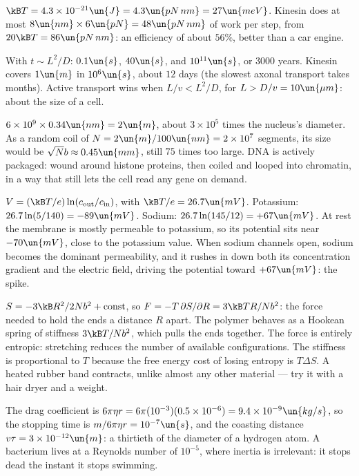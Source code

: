 
 $\kB T = 4.3\times10^{-21}\un{J} = 4.3\un{pN\,nm} = 27\un{meV}$. Kinesin does at most $8\un{nm}\times6\un{pN} = 48\un{pN\,nm}$ of work per step, from $20\kB T = 86\un{pN\,nm}$: an efficiency of about $56\%$, better than a car engine.

 With $t\sim L^2/D$: $0.1\un{s}$, $40\un{s}$, and $10^{11}\un{s}$, or $3000$ years. Kinesin covers $1\un{m}$ in $10^6\un{s}$, about $12$ days (the slowest axonal transport takes months). Active transport wins when $L/v<L^2/D$, for $L>D/v = 10\un{\mu m}$: about the size of a cell.

 $6\times10^9\times0.34\un{nm} = 2\un{m}$, about $3\times10^5$ times the nucleus's diameter. As a random coil of $N = 2\un{m}/100\un{nm} = 2\times10^7$ segments, its size would be $\sqrt Nb\approx0.45\un{mm}$, still $75$ times too large. DNA is actively packaged: wound around histone proteins, then coiled and looped into chromatin, in a way that still lets the cell read any gene on demand.

 $V = (\kB T/e)\ln(c_{\text{out}}/c_{\text{in}})$, with $\kB T/e = 26.7\un{mV}$. Potassium: $26.7\ln(5/140) = -89\un{mV}$. Sodium: $26.7\ln(145/12) = +67\un{mV}$. At rest the membrane is mostly permeable to potassium, so its potential sits near $-70\un{mV}$, close to the potassium value. When sodium channels open, sodium becomes the dominant permeability, and it rushes in down both its concentration gradient and the electric field, driving the potential toward $+67\un{mV}$: the spike.

 $S = -3\kB R^2/2Nb^2 + \text{const}$, so $F = -T\,\partial S/\partial R = 3\kB TR/Nb^2$: the force needed to hold the ends a distance $R$ apart. The polymer behaves as a Hookean spring of stiffness $3\kB T/Nb^2$, which pulls the ends together. The force is entirely entropic: stretching reduces the number of available configurations. The stiffness is proportional to $T$ because the free energy cost of losing entropy is $T\Delta S$. A heated rubber band contracts, unlike almost any other material --- try it with a hair dryer and a weight.

 The drag coefficient is $6\pi\eta r = 6\pi(10^{-3})(0.5\times10^{-6}) = 9.4\times10^{-9}\un{kg/s}$, so the stopping time is $m/6\pi\eta r = 10^{-7}\un{s}$, and the coasting distance $v\tau = 3\times10^{-12}\un{m}$: a thirtieth of the diameter of a hydrogen atom. A bacterium lives at a Reynolds number of $10^{-5}$, where inertia is irrelevant: it stops dead the instant it stops swimming.

